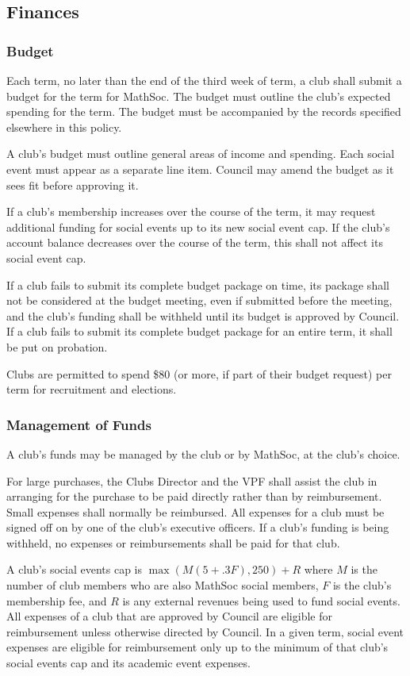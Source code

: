 \subsection{Finances}
\subsubsection{Budget}
Each term, no later than the end of the third week of term, a club shall submit
a budget for the term for MathSoc. The budget must outline the club's expected
spending for the term. The budget must be accompanied by the records specified
elsewhere in this policy.

A club's budget must outline general areas of income and spending. Each social
event must appear as a separate line item. Council may amend the budget as it
sees fit before approving it.

If a club's membership increases over the course of the term, it may request
additional funding for social events up to its new social event cap. If the
club's account balance decreases over the course of the term, this shall not
affect its social event cap.

If a club fails to submit its complete budget package on time, its package shall
not be considered at the budget meeting, even if submitted before the meeting,
and the club's funding shall be withheld until its budget is approved by
Council. If a club fails to submit its complete budget package for an entire
term, it shall be put on probation.

Clubs are permitted to spend \$80 (or more, if part of their budget request) per
term for recruitment and elections.

\subsubsection{Management of Funds}
A club's funds may be managed by the club or by MathSoc, at the club's choice.

For large purchases, the Clubs Director and the VPF shall assist the club in
arranging for the purchase to be paid directly rather than by reimbursement.
Small expenses shall normally be reimbursed.  All expenses for a club must be
signed off on by one of the club's executive officers. If a club's funding is
being withheld, no expenses or reimbursements shall be paid for that club.

A club's social events cap is $\max(M(5 + .3F), 250) + R$ where $M$ is the
number of club members who are also MathSoc social members, $F$ is the
club's membership fee, and $R$ is any external revenues being used to fund social events. All expenses of a club that are approved by Council are
eligible for reimbursement unless otherwise directed by Council. In a given
term, social event expenses are eligible for reimbursement only up to the
minimum of that club's social events cap and its academic event expenses.


